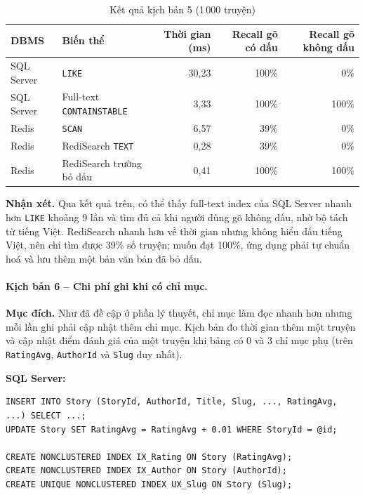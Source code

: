 \begin{table}[H]
\centering\small
\begin{tabular}{|l|l|r|r|r|}
\hline
\textbf{DBMS} & \textbf{Biến thể} & \textbf{Thời gian (ms)} & \textbf{Recall gõ có dấu} & \textbf{Recall gõ không dấu} \\ \hline
SQL Server & \texttt{LIKE} & 30,23 & 100\% & 0\% \\ \hline
SQL Server & Full-text \texttt{CONTAINSTABLE} & 3,33 & 100\% & 100\% \\ \hline
Redis & \texttt{SCAN} & 6,57 & 39\% & 0\% \\ \hline
Redis & RediSearch \texttt{TEXT} & 0,28 & 39\% & 0\% \\ \hline
Redis & RediSearch trường bỏ dấu & 0,41 & 100\% & 100\% \\ \hline
\end{tabular}
\caption{Kết quả kịch bản 5 (1\,000 truyện)}
\label{tab:idx-i5}
\end{table}

\textbf{Nhận xét.} Qua kết quả trên, có thể thấy full-text index của SQL Server nhanh hơn \texttt{LIKE} khoảng 9 lần và tìm đủ cả khi người dùng gõ không dấu, nhờ bộ tách từ tiếng Việt. RediSearch nhanh hơn về thời gian nhưng không hiểu dấu tiếng Việt, nên chỉ tìm được 39\% số truyện; muốn đạt 100\%, ứng dụng phải tự chuẩn hoá và lưu thêm một bản văn bản đã bỏ dấu.

\paragraph{Kịch bản 6 -- Chi phí ghi khi có chỉ mục.}

\textbf{Mục đích.} Như đã đề cập ở phần lý thuyết, chỉ mục làm đọc nhanh hơn nhưng mỗi lần ghi phải cập nhật thêm chỉ mục. Kịch bản đo thời gian thêm một truyện và cập nhật điểm đánh giá của một truyện khi bảng có 0 và 3 chỉ mục phụ (trên \texttt{RatingAvg}, \texttt{AuthorId} và \texttt{Slug} duy nhất).

\textbf{SQL Server:}

\begin{verbatim}
INSERT INTO Story (StoryId, AuthorId, Title, Slug, ..., RatingAvg, ...) SELECT ...;
UPDATE Story SET RatingAvg = RatingAvg + 0.01 WHERE StoryId = @id;

CREATE NONCLUSTERED INDEX IX_Rating ON Story (RatingAvg);
CREATE NONCLUSTERED INDEX IX_Author ON Story (AuthorId);
CREATE UNIQUE NONCLUSTERED INDEX UX_Slug ON Story (Slug);
\end{verbatim}

